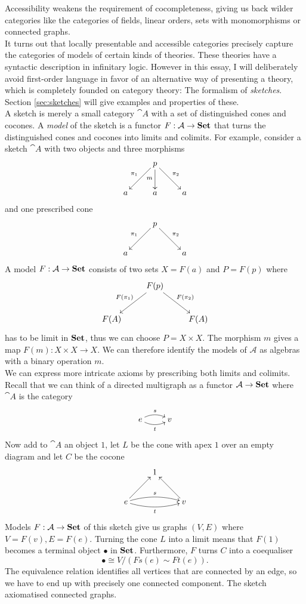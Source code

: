 Accessibility weakens the requirement of cocompleteness, giving us back wilder categories like the categories of fields, linear orders, sets with monomorphisms or connected graphs. \\

It turns out that locally presentable and accessible categories precisely capture the categories of models of certain kinds of theories. These theories have a syntactic description in infinitary logic. However in this essay, I will deliberately avoid first-order language in favor of an alternative way of presenting a theory, which is completely founded on category theory: The formalism of \emph{sketches}. Section \ref{sec:sketches} will give examples and properties of these. \\

A sketch is merely a small category $\cat A$ with a set of distinguished cones and cocones. A \emph{model} of the sketch is a functor $F : \mathcal{A} \to \mathbf{Set}$ that turns the distinguished cones and cocones into limits and colimits. For example, consider a sketch $\cat A$ with two objects and three morphisms
\[
\xymatrix{
  & p \ar[rd]^{\pi_2} \ar[d]_{m} \ar[ld]_{\pi_1} & \\
a & a & a
}\]
and one prescribed cone
\[
\xymatrix{
  & p \ar[rd]^{\pi_2} \ar[ld]_{\pi_1} & \\
a & & a
}\]
A model $F : \mathcal{A} \to \mathbf{Set}$ consists of two sets $X=F(a)$ and $P=F(p)$ where
\[
\xymatrix{
  & F(p) \ar[rd]^{F(\pi_2)} \ar[ld]_{F(\pi_1)} & \\
F(A) & & F(A)
}\]
has to be limit in $\mathbf{Set}$, thus we can choose $P = X \times X$. The morphism $m$ gives a map $F(m) : X \times X \to X$. We can therefore identify the models of $\mathcal A$ as algebras with a binary operation $m$. \\

We can express more intricate axioms by prescribing both limits and colimits. Recall that we can think of a directed multigraph as a functor $\mathcal{A} \to \mathbf{Set}$ where $\cat A$ is the category
\[
\xymatrix{
e \ar@/^/[r]^{s} \ar@/_/[r]_{t} & v
}\]
Now add to $\cat A$ an object $1$, let $L$ be the cone with apex $1$ over an empty diagram and let $C$ be the cocone \[
\xymatrix{
& 1 \\
e \ar@/^/[rr]^{s} \ar@/_/[rr]_{t} \ar[ru] & & v \ar[lu] \\
}\]
Models $F: \mathcal{A} \to \mathbf{Set}$ of this sketch give us graphs $(V,E)$ where $V=F(v),E=F(e)$. Turning the cone $L$ into a limit means that $F(1)$ becomes a terminal object $\bullet$ in $\mathbf{Set}$. Furthermore, $F$ turns $C$ into a coequaliser
\[ \bullet \cong V/(Fs(e)\sim Ft(e)). \]
The equivalence relation identifies all vertices that are connected by an edge, so we have to end up with precisely one connected component. The sketch axiomatised connected graphs. \\

